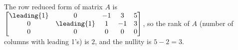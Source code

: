 The row reduced form of matrix $A$ is 
$\begin{bmatrix} 
\leading{1} & 0 & -1 & 3 & 5\\ 
0 & \leading{1} & 1& -1 & 3\\ 
0 & 0 & 0 & 0 & 0
\end{bmatrix}$, 
so the rank of $A$ (number of columns with leading 1's) is $2$, and the nullity is $5 - 2 = 3$.
